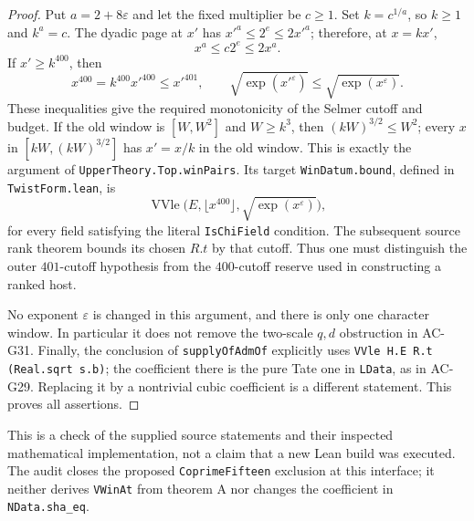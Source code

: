 \begin{proof}
Put $a=2+8\varepsilon$ and let the fixed multiplier be
$c\ge1$.  Set $k=c^{1/a}$, so $k\ge1$ and $k^a=c$.
The dyadic page at $x'$ has
$x'^a\le2^e\le2x'^a$; therefore, at $x=kx'$,
\[
                  x^a\le c2^e\le2x^a.                \tag{G34.4}
\]
If $x'\ge k^{400}$, then
\[
 x^{400}=k^{400}x'^{400}\le x'^{401},\qquad
 \sqrt{\exp(x'^\varepsilon)}
        \le\sqrt{\exp(x^\varepsilon)}.                \tag{G34.5}
\]
These inequalities give the required monotonicity of the
Selmer cutoff and budget.  If the old window is $[W,W^2]$
and $W\ge k^3$, then
$(kW)^{3/2}\le W^2$; every $x$ in
$[kW,(kW)^{3/2}]$ has $x'=x/k$ in the old window.
This is exactly the argument of
\texttt{UpperTheory.Top.winPairs}.
Its target \texttt{WinDatum.bound}, defined in
\texttt{TwistForm.lean}, is
\[
 \operatorname{VVle}
   \bigl(E,\lfloor x^{400}\rfloor,
                 \sqrt{\exp(x^\varepsilon)}\bigr),    \tag{G34.6}
\]
for every field satisfying the literal
\texttt{IsChiField} condition.
The subsequent source rank theorem bounds its chosen $R.t$
by that cutoff.  Thus one must distinguish the outer
$401$-cutoff hypothesis from the $400$-cutoff reserve used
in constructing a ranked host.

No exponent $\varepsilon$ is changed in this argument, and
there is only one character window.  In particular it does
not remove the two-scale $q,d$ obstruction in AC-G31.
Finally, the conclusion of \texttt{supplyOfAdmOf} explicitly
uses \texttt{VVle H.E R.t (Real.sqrt s.b)}; the coefficient
there is the pure Tate one in \texttt{LData}, as in AC-G29.
Replacing it by a nontrivial cubic coefficient is a different
statement.  This proves all assertions.
\end{proof}

This is a check of the supplied source statements and their
inspected mathematical implementation, not a claim that a
new Lean build was executed.  The audit closes the proposed
\texttt{CoprimeFifteen} exclusion at this interface; it neither
derives \texttt{VWinAt} from theorem A nor changes the
coefficient in \texttt{NData.sha\_eq}.
